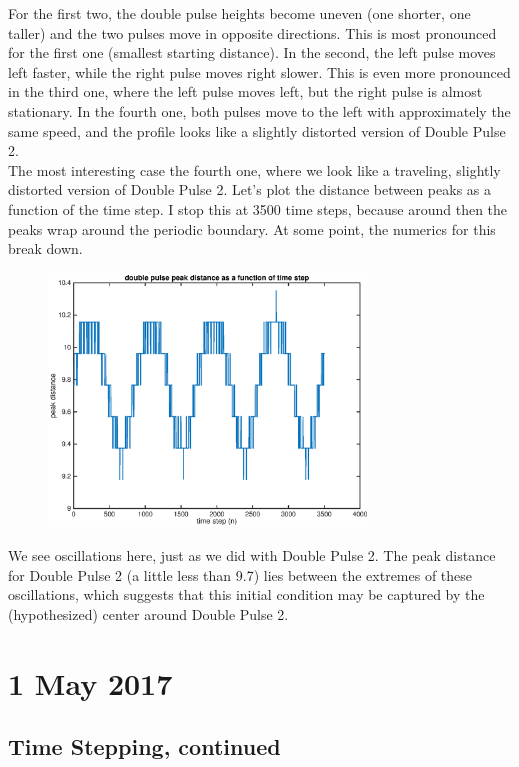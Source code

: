 \documentclass[12pt]{article}
\begin{document}
For the first two, the double pulse heights become uneven (one shorter, one taller) and the two pulses move in opposite directions. This is most pronounced for the first one (smallest starting distance). In the second, the left pulse moves left faster, while the right pulse moves right slower. This is even more pronounced in the third one, where the left pulse moves left, but the right pulse is almost stationary. In the fourth one, both pulses move to the left with approximately the same speed, and the profile looks like a slightly distorted version of Double Pulse 2.\\

The most interesting case the fourth one, where we look like a traveling, slightly distorted version of Double Pulse 2. Let's plot the distance between peaks as a function of the time step. I stop this at 3500 time steps, because around then the peaks wrap around the periodic boundary. At some point, the numerics for this break down.

\begin{figure}[H]
	\includegraphics[width=8.5cm]{2double1_osc1.eps}
\end{figure}
We see oscillations here, just as we did with Double Pulse 2. The peak distance for Double Pulse 2 (a little less than 9.7) lies between the extremes of these oscillations, which suggests that this initial condition may be captured by the (hypothesized) center around Double Pulse 2.

\section*{1 May 2017}

\subsection*{Time Stepping, continued}
\end{document}
